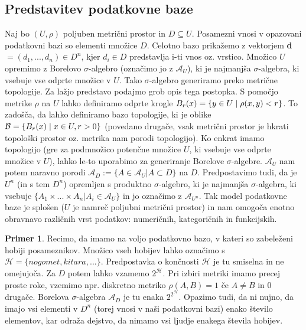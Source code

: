 \documentclass[12pt,a4paper]{amsart}
\theoremstyle{definition} %
\newtheorem{primer}[definicija]{Primer}
\theoremstyle{plain} %
\begin{document}
\subsection{Predstavitev podatkovne baze}
Naj bo $(U, \rho)$ poljuben metrični prostor in $D \subseteq U$. Posamezni vnosi v opazovani podatkovni bazi so elementi množice $D$. Celotno bazo prikažemo z vektorjem \textbf{d} $= (d_{1}, ..., d_{n}) \in D^n$, kjer $d_{i} \in D$ predstavlja i-ti vnos oz. vrstico. 
\newline
\newline
Množico $U$ opremimo z Borelovo $\sigma$-algebro (označimo jo z $\mathcal{A}_{U}$), ki je najmanjša $\sigma$-algebra, ki vsebuje vse odprte množice v $U$. Tako $\sigma$-algebro generiramo preko metrične topologije. Za lažjo predstavo podajmo grob opis tega postopka. S pomočjo metrike $\rho$ na $U$ lahko definiramo odprte krogle  $B_{r}(x) = \{y \in U\hspace{0.1cm}|\hspace{0.1cm}\rho(x,y) < r\}$. To zadošča, da lahko definiramo bazo topologije, ki je oblike $\mathcal{B} = \{B_{r}(x)\hspace{0.1cm}|\hspace{0.1cm}x \in U, r>0\}$ (povedano drugače, vsak metrični prostor je hkrati topološki prostor oz. metrika nam porodi topologijo). Ko enkrat imamo topologijo  (gre za podmnožico potenčne množice $U$, ki vsebuje vse odprte množice v $U$), lahko le-to uporabimo za generiranje Borelove $\sigma$-algebre.
\newline
\newline
$\mathcal{A}_{U}$ nam potem naravno porodi $\mathcal{A}_{D} := \{A \in \mathcal{A}_{U} | A \subset D \}$ na $D$. Predpostavimo tudi, da je $U^n$ (in s tem $D^n$) opremljen s produktno $\sigma$-algebro, ki je najmanjša $\sigma$-algebra, ki vsebuje $\{A_{1} \times ... \times A_{n} | A_{i} \in \mathcal{A}_{U}\}$ in jo označimo z $\mathcal{A}_{U^n}$. 
\newline
\newline
Tak model podatkovne baze je splošen ($U$ je namreč poljubni metrični prostor) in nam omogoča enotno obravnavo različnih vrst podatkov: numeričnih, kategoričnih in funkcijskih.
\begin{primer}  
Recimo, da imamo na voljo podatkovno bazo, v kateri so zabeleženi hobiji posameznikov. Množico vseh hobijev lahko označimo s $\mathcal{H}=\{nogomet, kitara,...\}$. Predpostavka o končnosti $\mathcal{H}$ je tu smiselna in ne omejujoča. Za $D$ potem lahko vzamemo $2^\mathcal{H}$. Pri izbiri metriki imamo precej proste roke, vzemimo npr. diskretno metriko  $\rho(A,B)=1$ če $A \neq B$ in 0 drugače. Borelova $\sigma$-algebra $\mathcal{A}_{D}$ je tu enaka $2^{2^{\mathcal{H}}}$. Opazimo tudi, da ni nujno, da imajo vsi elementi v $D^n$ (torej vnosi v naši podatkovni bazi) enako število elementov, kar odraža dejstvo, da nimamo vsi ljudje enakega števila hobijev.
\end{primer}
\end{document}

